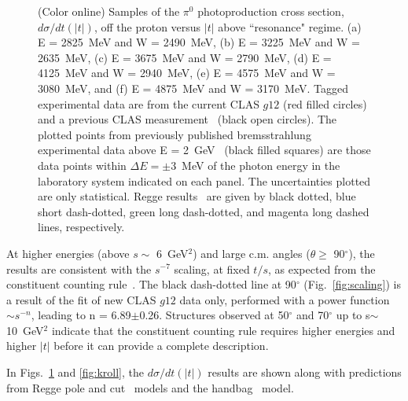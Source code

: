 \documentclass[aps,prc,twocolumn,floatfix,showpacs,preprintnumbers,amsmath,amssymb,superscriptaddress,linenumbers]{revtex4-1}
\begin{document}
\begin{figure}[htb!]
        \caption {(Color online) Samples of the $\pi^0$ photoproduction 
	cross section, $d\sigma/dt(|t|)$, off the proton versus $|t|$ 
	above ``resonance" regime.  
	(a) E = 2825~MeV and W = 2490~MeV, 
	(b) E = 3225~MeV and W = 2635~MeV,
	(c) E = 3675~MeV and W = 2790~MeV, 
	(d) E = 4125~MeV and W = 2940~MeV,
	(e) E = 4575~MeV and W = 3080~MeV, and
	(f) E = 4875~MeV and W = 3170~MeV.
	Tagged experimental data are from the current CLAS $g12$ (red 
	filled circles) and a previous CLAS 
	measurement~\protect\cite{Dugger:2007bt} (black open circles). 
	The plotted points from previously published bremsstrahlung 
	experimental data above E = 2~GeV~\protect\cite{brem} (black 
	filled squares) are those data points within $\Delta E = 
	\pm$3~MeV of the photon energy in the laboratory system 
	indicated on each panel. The uncertainties plotted are only 
	statistical. 
	Regge results~\protect\cite{Goldstein:1973xn,Laget:2005be,
	Mathieu:2015eia,Donnachie:2015jaa} are given by black dotted, 
	blue short dash-dotted, green long dash-dotted, and magenta 
	long dashed lines, respectively.} 
	\label{fig:t_data}
\end{figure}


At higher energies (above $s\sim$ 6~GeV$^2$) and large c.m. angles 
($\theta\geq$ 90$^\circ$), the results are consistent with 
the $s^{-7}$ scaling, at fixed $t/s$, as expected from the 
constituent counting rule~\cite{Brodsky:1973kr}. 
The black dash-dotted line at 90$^\circ$ (Fig.~\ref{fig:scaling}) 
is a result of the fit of new CLAS $g12$ data only, performed with a 
power function $\sim s^{-n}$, leading to n = 6.89$\pm$0.26.  
Structures observed at 50$^\circ$ and 70$^\circ$ up to 
s$\sim$10~GeV$^2$ indicate that the constituent 
counting rule requires higher energies and higher $|t|$ before it 
can provide a complete description.


In Figs.~\ref{fig:t_data} and \ref{fig:kroll}, the 
$d\sigma/dt(|t|)$ results are shown along with predictions from 
Regge pole and cut~\cite{Goldstein:1973xn,Laget:2005be,
Mathieu:2015eia,Donnachie:2015jaa} models and the 
handbag~\cite{Huang:2000kd} model. 
\end{document}

